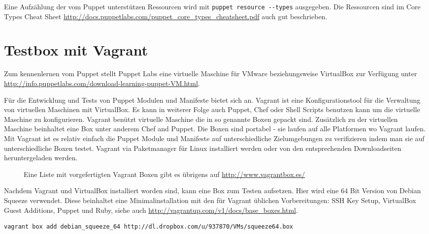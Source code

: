 \documentclass[12pt,a4paper,ngerman]{article}
\begin{document}
Eine Aufzählung der vom Puppet unterstützen Ressourcen wird mit \lstinline$puppet resource --types$ ausgegeben. Die Ressourcen sind im Core Types Cheat Sheet \url{http://docs.puppetlabs.com/puppet_core_types_cheatsheet.pdf} auch gut beschrieben.

\section{Testbox mit Vagrant}
Zum kennenlernen vom Puppet stellt Puppet Labs eine virtuelle Maschine für VMware beziehungsweise VirtualBox zur Verfügung unter \url{http://info.puppetlabs.com/download-learning-puppet-VM.html}. 

Für die Entwicklung und Tests von Puppet Modulen und Manifeste bietet sich \cite{vagrant} an. Vagrant ist eine Konfigurationstool für die Verwaltung von virtuellen Maschinen mit VirtualBox. Es kann in weiterer Folge auch Puppet, Chef oder Shell Scripts benutzen kann um die virtuelle Maschine zu konfigurieren. Vagrant benützt virtuelle Maschine die in so genannte Boxen gepackt sind. Zusätzlich zu der virtuellen Maschine beinhaltet eine Box unter anderem Chef and Puppet. Die Boxen sind portabel - sie laufen auf alle Platformen wo Vagrant laufen. Mit Vagrant ist es relativ einfach die Puppet Module und Manifeste auf unterschiedliche Zielumgebungen zu verifizieren indem man sie auf unterschiedliche Boxen testet. Vagrant via Paketmanager für Linux installiert werden oder von den entsprechenden Downloadseiten heruntergeladen werden.

\begin{figure}
\vspace{-15pt}
\begin{boxedminipage}{5cm}
Eine Liste mit vorgefertigten Vagrant Boxen gibt es übrigens auf \url{http://www.vagrantbox.es/}
\end{boxedminipage}
\vspace{-15pt}
\end{figure}

Nachdem Vagrant und VirtualBox installiert worden sind, kann eine Box zum Testen aufsetzen. Hier wird eine 64 Bit Version von Debian Squeeze verwendet. Diese beinhaltet eine Minimalinstallation mit den für Vagrant üblichen Vorbereitungen: SSH Key Setup, VirtualBox Guest Additions, Puppet und Ruby, siehe auch \url{http://vagrantup.com/v1/docs/base_boxes.html}.

\begin{lstlisting}[language=sh,caption=Download der Vagrant Box, label=vagrant-add]
vagrant box add debian_squeeze_64 http://dl.dropbox.com/u/937870/VMs/squeeze64.box
\end{lstlisting}
\end{document}
